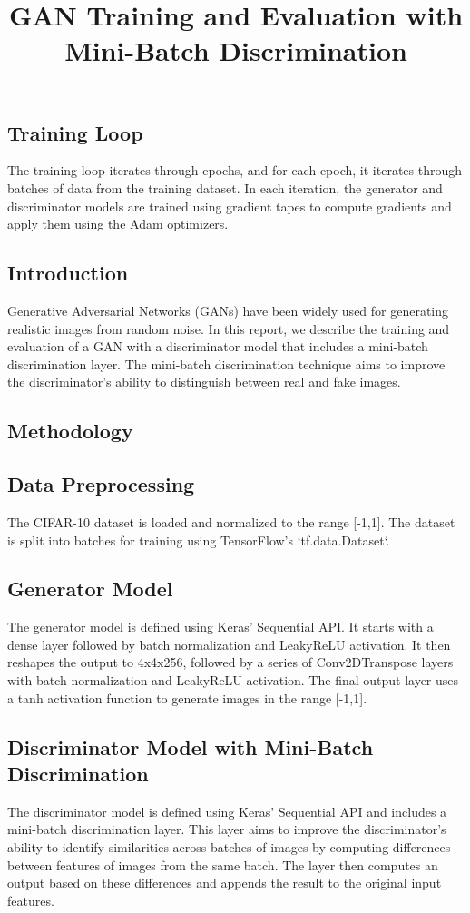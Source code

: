 \documentclass{article}
\begin{document}
\subsection{Training Loop}
The training loop iterates through epochs, and for each epoch, it iterates through batches of data from the training dataset. In each iteration, the generator and discriminator models are trained using gradient tapes to compute gradients and apply them using the Adam optimizers.


\title{GAN Training and Evaluation with Mini-Batch Discrimination}


\subsection{Introduction}
Generative Adversarial Networks (GANs) have been widely used for generating realistic images from random noise. In this report, we describe the training and evaluation of a GAN with a discriminator model that includes a mini-batch discrimination layer. The mini-batch discrimination technique aims to improve the discriminator's ability to distinguish between real and fake images.

\subsection{Methodology}

\subsection{Data Preprocessing}
The CIFAR-10 dataset is loaded and normalized to the range [-1,1]. The dataset is split into batches for training using TensorFlow's `tf.data.Dataset`.

\subsection{Generator Model}
The generator model is defined using Keras' Sequential API. It starts with a dense layer followed by batch normalization and LeakyReLU activation. It then reshapes the output to 4x4x256, followed by a series of Conv2DTranspose layers with batch normalization and LeakyReLU activation. The final output layer uses a tanh activation function to generate images in the range [-1,1].

\subsection{Discriminator Model with Mini-Batch Discrimination}
The discriminator model is defined using Keras' Sequential API and includes a mini-batch discrimination layer. This layer aims to improve the discriminator's ability to identify similarities across batches of images by computing differences between features of images from the same batch. The layer then computes an output based on these differences and appends the result to the original input features.
\end{document}
